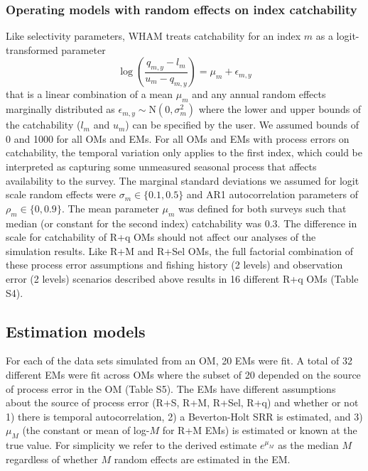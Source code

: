 \documentclass[
  12pt,
]{article}
\begin{document}
\subsubsection*{Operating models with random effects on index
catchability}\label{operating-models-with-random-effects-on-index-catchability}

Like selectivity parameters, WHAM treats catchability for an index \(m\)
as a logit-transformed parameter \[
\log\left(\frac{q_{m,y}-l_{m}}{u_{m}-q_{m,y}}\right) = \mu_m + \epsilon_{m,y}
\] that is a linear combination of a mean \(\mu_m\) and any annual
random effects marginally distributed as
\(\epsilon_{m,y} \sim \text{N}\left(0,\sigma_m^2\right)\) where the
lower and upper bounds of the catchability (\(l_m\) and \(u_m\)) can be
specified by the user. We assumed bounds of 0 and 1000 for all OMs and
EMs. For all OMs and EMs with process errors on catchability, the
temporal variation only applies to the first index, which could be
interpreted as capturing some unmeasured seasonal process that affects
availability to the survey. The marginal standard deviations we assumed
for logit scale random effects were \(\sigma_m \in \{0.1, 0.5\}\) and
AR1 autocorrelation parameters of \(\rho_m \in \{0,0.9\}\). The mean
parameter \(\mu_m\) was defined for both surveys such that median (or
constant for the second index) catchability was 0.3. The difference in
scale for catchability of R+q OMs should not affect our analyses of the
simulation results. Like R+M and R+Sel OMs, the full factorial
combination of these process error assumptions and fishing history (2
levels) and observation error (2 levels) scenarios described above
results in 16 different R+q OMs (Table S4).

\subsection*{Estimation models}\label{estimation-models}

For each of the data sets simulated from an OM, 20 EMs were fit. A total
of 32 different EMs were fit across OMs where the subset of 20 depended
on the source of process error in the OM (Table S5). The EMs have
different assumptions about the source of process error (R+S, R+M,
R+Sel, R+q) and whether or not 1) there is temporal autocorrelation, 2)
a Beverton-Holt SRR is estimated, and 3) \(\mu_M\) (the constant or mean
of log-\(M\) for R+M EMs) is estimated or known at the true value. For
simplicity we refer to the derived estimate \(e^{\mu_M}\) as the median
\(M\) regardless of whether \(M\) random effects are estimated in the
EM.
\end{document}
